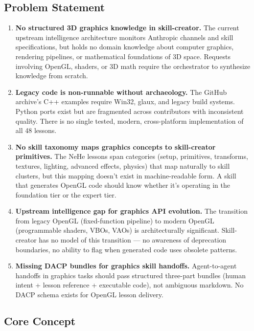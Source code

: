 \documentclass[11pt,letterpaper]{article}
\begin{document}
\subsection{Problem Statement}

\begin{enumerate}
\item \textbf{No structured 3D graphics knowledge in skill-creator.} The current upstream intelligence architecture monitors Anthropic channels and skill specifications, but holds no domain knowledge about computer graphics, rendering pipelines, or mathematical foundations of 3D space. Requests involving OpenGL, shaders, or 3D math require the orchestrator to synthesize knowledge from scratch.

\item \textbf{Legacy code is non-runnable without archaeology.} The GitHub archive's C++ examples require Win32, glaux, and legacy build systems. Python ports exist but are fragmented across contributors with inconsistent quality. There is no single tested, modern, cross-platform implementation of all 48 lessons.

\item \textbf{No skill taxonomy maps graphics concepts to skill-creator primitives.} The NeHe lessons span categories (setup, primitives, transforms, textures, lighting, advanced effects, physics) that map naturally to skill clusters, but this mapping doesn't exist in machine-readable form. A skill that generates OpenGL code should know whether it's operating in the foundation tier or the expert tier.

\item \textbf{Upstream intelligence gap for graphics API evolution.} The transition from legacy OpenGL (fixed-function pipeline) to modern OpenGL (programmable shaders, VBOs, VAOs) is architecturally significant. Skill-creator has no model of this transition --- no awareness of deprecation boundaries, no ability to flag when generated code uses obsolete patterns.

\item \textbf{Missing DACP bundles for graphics skill handoffs.} Agent-to-agent handoffs in graphics tasks should pass structured three-part bundles (human intent + lesson reference + executable code), not ambiguous markdown. No DACP schema exists for OpenGL lesson delivery.
\end{enumerate}

\subsection{Core Concept}
\end{document}
